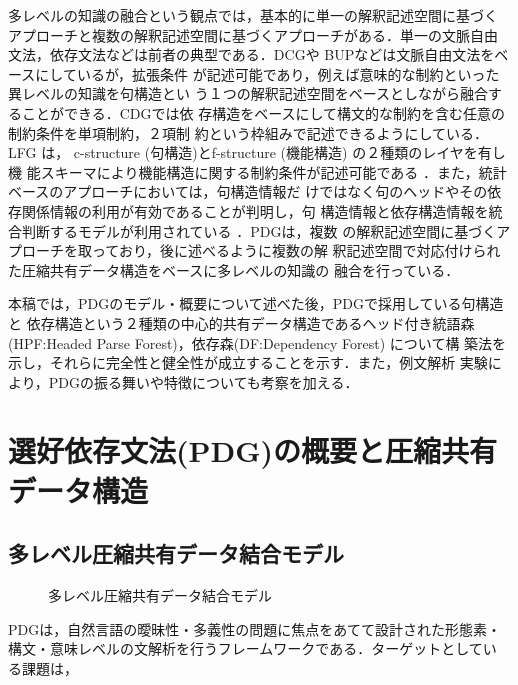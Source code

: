 多レベルの知識の融合という観点では，基本的に単一の解釈記述空間に基づく
アプローチと複数の解釈記述空間に基づくアプローチがある．単一の文脈自由
文法，依存文法などは前者の典型である．DCG\cite{Pereira80}や
BUP\cite{Matsumoto83}などは文脈自由文法をベースにしているが，拡張条件
が記述可能であり，例えば意味的な制約といった異レベルの知識を句構造とい
う１つの解釈記述空間をベースとしながら融合することができる．CDGでは依
存構造をベースにして構文的な制約を含む任意の制約条件を単項制約，２項制
約という枠組みで記述できるようにしている\cite{Maruyama90}．LFG は，
c-structure (句構造)とf-structure (機能構造) の２種類のレイヤを有し機
能スキーマにより機能構造に関する制約条件が記述可能である
\cite{Kaplan89}．また，統計ベースのアプローチにおいては，句構造情報だ
けではなく句のヘッドやその依存関係情報の利用が有効であることが判明し，句
構造情報と依存構造情報を統合判断するモデルが利用されている
\cite{Carroll92,Eisner96b,Collins99,Charniak00,Bikel04}．PDGは，複数
の解釈記述空間に基づくアプローチを取っており，後に述べるように複数の解
釈記述空間で対応付けられた圧縮共有データ構造をベースに多レベルの知識の
融合を行っている．

本稿では，PDGのモデル・概要について述べた後，PDGで採用している句構造と
依存構造という２種類の中心的共有データ構造であるヘッド付き統語森
(HPF:Headed Parse Forest)，依存森(DF:Dependency Forest) について構
築法を示し，それらに完全性と健全性が成立することを示す．また，例文解析
実験により，PDGの振る舞いや特徴についても考察を加える．

\section{選好依存文法(PDG)の概要と圧縮共有データ構造}

\subsection{多レベル圧縮共有データ結合モデル}

\begin{figure}[b]
 \begin{center}
 \end{center}
\myfiglabelskip
\caption{多レベル圧縮共有データ結合モデル}
\label{fig:MultilevelPSDataConnectionModel}
\end{figure}

PDGは，自然言語の曖昧性・多義性の問題に焦点をあてて設計された形態素・
構文・意味レベルの文解析を行うフレームワークである．ターゲットとしてい
る課題は，

